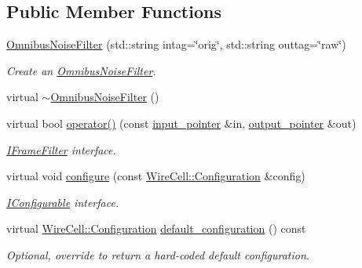 \subsection*{Public Member Functions}
\begin{DoxyCompactItemize}
\item 
\hyperlink{class_wire_cell_1_1_sig_proc_1_1_omnibus_noise_filter_aa968cf19dcd4e95020cc7959deffcc63}{Omnibus\+Noise\+Filter} (std\+::string intag=\char`\"{}orig\char`\"{}, std\+::string outtag=\char`\"{}raw\char`\"{})
\begin{DoxyCompactList}\small\item\em Create an \hyperlink{class_wire_cell_1_1_sig_proc_1_1_omnibus_noise_filter}{Omnibus\+Noise\+Filter}. \end{DoxyCompactList}\item 
virtual \hyperlink{class_wire_cell_1_1_sig_proc_1_1_omnibus_noise_filter_ac26a3997c8b8640c2a43b4bd1cec03fc}{$\sim$\+Omnibus\+Noise\+Filter} ()
\item 
virtual bool \hyperlink{class_wire_cell_1_1_sig_proc_1_1_omnibus_noise_filter_a861a76be3558adf47d2f7da5b00357f1}{operator()} (const \hyperlink{class_wire_cell_1_1_i_function_node_a55c0946156df9b712b8ad1a0b59b2db6}{input\+\_\+pointer} \&in, \hyperlink{class_wire_cell_1_1_i_function_node_afc02f1ec60d31aacddf64963f9ca650b}{output\+\_\+pointer} \&out)
\begin{DoxyCompactList}\small\item\em \hyperlink{class_wire_cell_1_1_i_frame_filter}{I\+Frame\+Filter} interface. \end{DoxyCompactList}\item 
virtual void \hyperlink{class_wire_cell_1_1_sig_proc_1_1_omnibus_noise_filter_ab0cec8bc8e82f741f33cc663dc9eddc5}{configure} (const \hyperlink{namespace_wire_cell_a9f705541fc1d46c608b3d32c182333ee}{Wire\+Cell\+::\+Configuration} \&config)
\begin{DoxyCompactList}\small\item\em \hyperlink{class_wire_cell_1_1_i_configurable}{I\+Configurable} interface. \end{DoxyCompactList}\item 
virtual \hyperlink{namespace_wire_cell_a9f705541fc1d46c608b3d32c182333ee}{Wire\+Cell\+::\+Configuration} \hyperlink{class_wire_cell_1_1_sig_proc_1_1_omnibus_noise_filter_afb8457ee3c6181bfeee597b11fe8e4f7}{default\+\_\+configuration} () const
\begin{DoxyCompactList}\small\item\em Optional, override to return a hard-\/coded default configuration. \end{DoxyCompactList}\item 

\end{DoxyCompactItemize}
